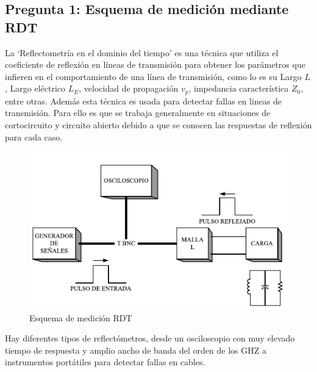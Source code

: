 \documentclass[11pt,onecolumn]{article}
\begin{document}
\subsection*{Pregunta 1: Esquema de medición mediante RDT}

La `Reflectometría en el dominio del tiempo' es una técnica que  utiliza el coeficiente de reflexión en líneas de transmisión para obtener los parámetros que infieren en el comportamiento de una línea de transmisión, como lo es su Largo $L$, Largo eléctrico $L_{E}$, velocidad de propagación $v_{p}$, impedancia característica $Z_{0}$, entre otras. Además esta técnica es usada para detectar fallas en lineas de transmisión. Para ello es que se trabaja generalmente en situaciones de cortocircuito y circuito abierto debido a que se conocen las respuestas de reflexión para cada caso.

\begin{figure}
  \begin{center}
    \includegraphics[scale = 1]{img/schema.pdf}
  \end{center}
  \caption{Esquema de medición RDT}
  \label{fig:schrdt}
\end{figure}

Hay diferentes tipos de reflectómetros, desde un osciloscopio con muy elevado tiempo de respuesta y amplio ancho de banda del orden de los 
GHZ a instrumentos portátiles para detectar fallas en cables. 
\end{document}
